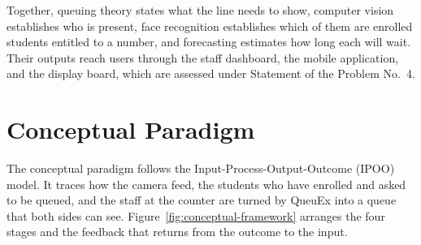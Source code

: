 \documentclass{research}
\newcommand{\sysname}{QueuEx}
\begin{document}
Together, queuing theory states what the line needs to show, computer
vision establishes who is present, face recognition establishes which of
them are enrolled students entitled to a number, and forecasting
estimates how long each will wait. Their outputs reach users through the
staff dashboard, the mobile application, and the display board, which
are assessed under Statement of the Problem No.~4.

\section{Conceptual Paradigm}
\label{sec:conceptual-framework}

The conceptual paradigm follows the Input-Process-Output-Outcome (IPOO)
model. It traces how the camera feed, the students who have enrolled and
asked to be queued, and the staff at the counter are turned by \sysname{}
into a queue that both sides can see.
Figure~\ref{fig:conceptual-framework} arranges the four stages and the
feedback that returns from the outcome to the input.
\end{document}
